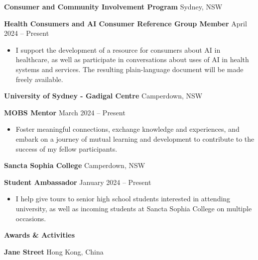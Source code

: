 \documentclass[11pt]{article}
\begin{document}
\vspace{12pt}

\textbf{Consumer and Community Involvement Program} \hfill Sydney, NSW

\textbf{Health Consumers and AI Consumer Reference Group Member} \hfill April 2024 – Present
\begin{itemize}[noitemsep, topsep=0pt, partopsep=0pt, parsep=0pt]
    \item I support the development of a resource for consumers about AI in healthcare, as well as participate in conversations about uses of AI in health systems and services. The resulting plain-language document will be made freely available.
\end{itemize}

\vspace{12pt}

\textbf{University of Sydney - Gadigal Centre} \hfill Camperdown, NSW

\textbf{MOBS Mentor} \hfill March 2024 – Present
\begin{itemize}[noitemsep, topsep=0pt, partopsep=0pt, parsep=0pt]
    \item Foster meaningful connections, exchange knowledge and experiences, and embark on a journey of mutual learning and development to contribute to the success of my fellow participants. 
\end{itemize}

\vspace{12pt}

\textbf{Sancta Sophia College} \hfill Camperdown, NSW

\textbf{Student Ambassador} \hfill January 2024 – Present
\begin{itemize}[noitemsep, topsep=0pt, partopsep=0pt, parsep=0pt]
    \item I help give tours to senior high school students interested in attending university, as well as incoming students at Sancta Sophia College on multiple occasions.
\end{itemize}

\vspace{12pt}

\begin{center}
    \textbf{Awards \& Activities}\\
    \hrulefill
\end{center}

\textbf{Jane Street} \hfill Hong Kong, China
\end{document}
